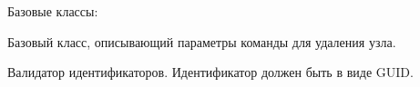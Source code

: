 \documentclass[a4paper,10pt,russian]{sphinxmanual}
\begin{document}
\begin{fulllineitems}

\pysigstartsignatures
{}
\pysigstopsignatures
\sphinxAtStartPar
Базовые классы: 

\sphinxAtStartPar
Базовый класс, описывающий параметры
команды для удаления узла.


\begin{fulllineitems}

\pysigstartsignatures
{}
\pysigstopsignatures
\sphinxAtStartPar
Валидатор идентификаторов.
Идентификатор должен быть в виде GUID.

\end{fulllineitems}


\end{fulllineitems}
\end{document}
